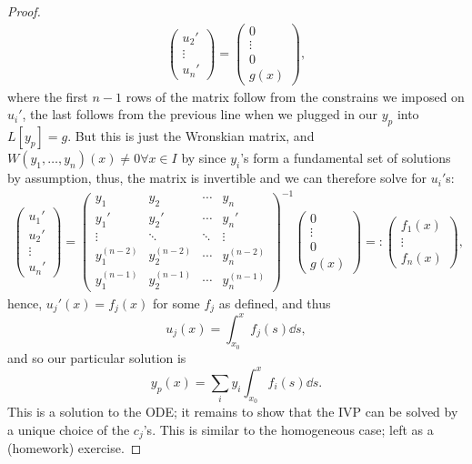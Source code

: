 \begin{proof}
\begin{align*}
\begin{pmatrix}
            u_2'\\
            \vdots\\
            u_n'
        \end{pmatrix} = \begin{pmatrix}
            0\\
            \vdots\\
            0\\
            g(x)
        \end{pmatrix},
    \end{align*}
    where the first $n-1$ rows of the matrix follow from the constrains we imposed on $u_i'$, the last follows from the previous line when we plugged in our $y_p$ into $L[y_p] = g$. But this is just the Wronskian matrix, and $W(y_1, \dots, y_n)(x) \neq 0 \forall x \in I$ by  since $y_i$'s form a fundamental set of solutions by assumption, thus, the matrix is invertible and we can therefore solve for $u_i'$s:
    \begin{align*}
        \begin{pmatrix}
            u_1'\\
            u_2'\\
            \vdots\\
            u_n'
        \end{pmatrix} = \begin{pmatrix}
            y_1 & y_2 & \cdots & y_n\\
            y_1' & y_2' & \cdots & y_n'\\
            \vdots & \ddots & \ddots & \vdots \\
            y_1^{(n-2)} & y_2^{(n-2)} & \cdots & y_n^{(n-2)}\\
            y_1^{(n-1)} & y_2^{(n-1)} & \cdots & y_n^{(n-1)}
        \end{pmatrix}^{-1}\begin{pmatrix}
            0\\
            \vdots\\
            0\\
            g(x)
        \end{pmatrix} =: \begin{pmatrix}
            f_1(x)\\
            \vdots \\
            f_n(x)
        \end{pmatrix},
    \end{align*}
    hence, $u_j'(x) = f_j(x)$ for some $f_j$ as defined, and thus \[
    u_j(x) = \int_{x_0}^x f_j(s) \dd{s},
    \]
    and so our particular solution is \[
    y_p(x) = \sum_i y_i \int_{x_0}^x f_i(s) \dd{s}.
    \]
    This is a solution to the ODE; it remains to show that the IVP can be solved by a unique choice of the $c_j$'s. This is similar to the homogeneous case; left as a (homework) exercise.
\end{proof}

